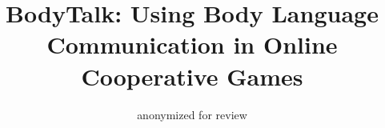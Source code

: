\documentclass{sigchi}
\begin{document}
\title{BodyTalk: Using Body Language\\ Communication in Online Cooperative Games}

\author{
  \alignauthor anonymized for review\\
}


%

\maketitle
\end{document}
